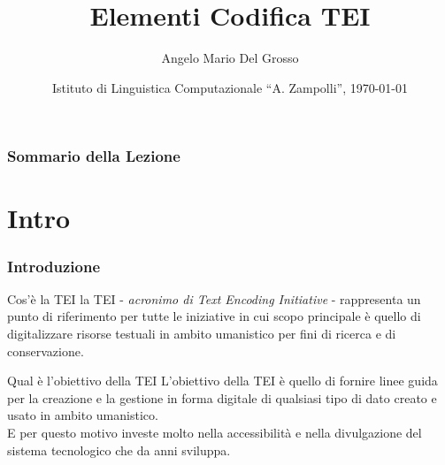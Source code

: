 \documentclass{beamer}
\title{Elementi Codifica TEI}
\author[A.M. Del Grosso]{Angelo Mario Del Grosso}
\institute{\texttt{angelo.delgrosso@ilc.cnr.it} \\\bigskip\textit{CNR-ILC-LicoLab} \\\bigskip\url{http://licolab.ilc.cnr.it/}}
\date{Istituto di Linguistica Computazionale ``A. Zampolli'', \today}
\begin{document}
\begin{frame}
	\maketitle
\end{frame}

\begin{frame}
	\frametitle{Sommario della Lezione}
	\tableofcontents
\end{frame}

\section{Intro}

\begin{frame}
	\frametitle{Introduzione}
	\addtocounter{nframe}{1}
    

    \begin{block}{Cos'è la TEI}
        la TEI - \textit{acronimo di Text Encoding Initiative} - rappresenta un punto di riferimento per tutte le iniziative in cui scopo principale è quello di digitalizzare risorse testuali in ambito umanistico per fini di ricerca e di conservazione.
    \end{block}

    \begin{block}{Qual è l'obiettivo della TEI}
        L'obiettivo della TEI è quello di fornire linee guida per la creazione e la gestione in forma digitale di qualsiasi tipo di dato creato e usato in ambito umanistico.
        \\ E per questo motivo investe molto nella accessibilità e nella divulgazione del sistema tecnologico che da anni sviluppa.
    \end{block}
    
\end{frame}
\end{document}

